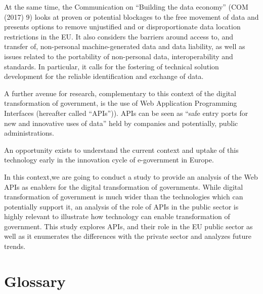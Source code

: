 At the same time, the Communication on “Building the data economy” (COM (2017) 9)
looks at proven or potential blockages to the free movement of data and presents
options to remove unjustified and or disproportionate data location restrictions
in the EU. It also considers the barriers around access to, and transfer of,
non-personal machine-generated data and data liability, as well as issues related
to the portability of non-personal data, interoperability and standards.
In particular, it calls for the fostering of technical solution development for
the reliable identification and exchange of data. 

A further avenue for research, complementary to this context of the digital
transformation of government, is the use of Web Application Programming Interfaces
(hereafter called “APIs”)). APIs can be seen as “safe entry ports for new and
innovative uses of data” held by companies and potentially, public administrations.

An opportunity exists to understand the current context and uptake of this technology
early in the innovation cycle of e-government in Europe.

In this context,we are going to conduct a study to provide an analysis of the
Web APIs as enablers for the digital transformation of governments. While
digital transformation of government is much wider than the technologies which
can potentially support it, an analysis of the role of APIs in the public sector
is highly relevant to illustrate how technology can enable transformation of
government. This study explores APIs, and their role in the EU public sector as
well as it enumerates the differences with the private sector and analyzes future
trends.

\clearpage

\section{Glossary} %

